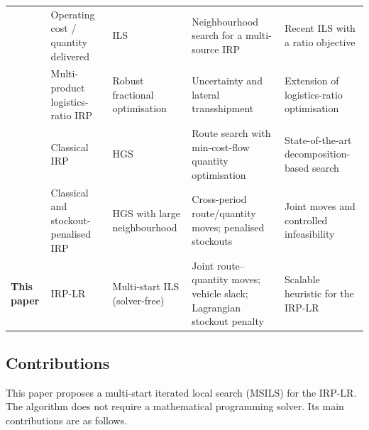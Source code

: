 \documentclass{article}
\begin{document}
\begin{table}[!htbp]
\begin{tabularx}{\textwidth}{
>{\raggedright\arraybackslash}p{2.3cm}
>{\raggedright\arraybackslash}p{2.6cm}
>{\raggedright\arraybackslash}p{2.8cm}
>{\raggedright\arraybackslash}X
>{\raggedright\arraybackslash}X}
\citet{alonsopecina2024iterated} & Operating cost / quantity delivered
  & ILS & Neighbourhood search for a multi-source IRP
  & Recent ILS with a ratio objective \\
\citet{man2025logistics} & Multi-product logistics-ratio IRP
  & Robust fractional optimisation & Uncertainty and lateral transshipment
  & Extension of logistics-ratio optimisation \\
\citet{castro2026hybrid} & Classical IRP & HGS
  & Route search with min-cost-flow quantity optimisation
  & State-of-the-art decomposition-based search \\
\citet{zhao2025large} & Classical and stockout-penalised IRP
  & HGS with large neighbourhood
  & Cross-period route/quantity moves; penalised stockouts
  & Joint moves and controlled infeasibility \\
\midrule
\textbf{This paper} & IRP-LR & Multi-start ILS (solver-free)
  & Joint route--quantity moves; vehicle slack; Lagrangian stockout penalty
  & Scalable heuristic for the IRP-LR \\
\bottomrule
\end{tabularx}
\end{table}

\subsection{Contributions}
\label{sec:intro_contributions}

This paper proposes a multi-start iterated local search (MSILS) for the
IRP-LR. The algorithm does not require a mathematical programming solver.
Its main contributions are as follows.
\end{document}
